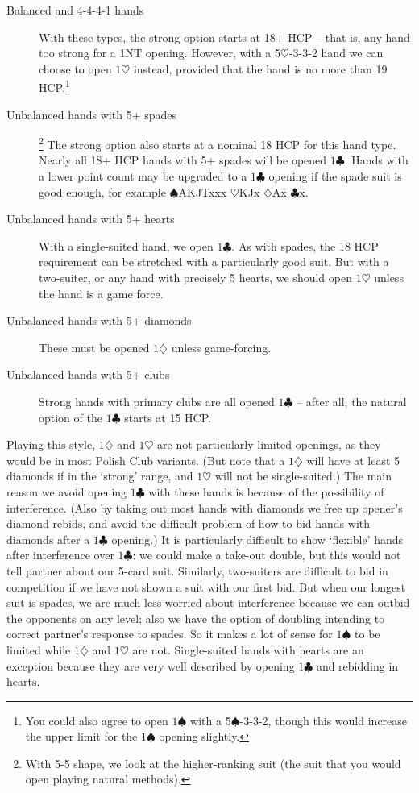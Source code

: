 \documentclass{article}
\newcommand{\sz}{\spadesuit}
\newcommand{\hz}{\heartsuit}
\newcommand{\dz}{\diamondsuit}
\newcommand{\cz}{\clubsuit}
\begin{document}
\begin{description}
\item[Balanced and 4-4-4-1 hands] With these types, the strong option starts at 18+ HCP -- that is, any hand too strong for a 1NT opening. However, with a 5$\hz$-3-3-2 hand we can choose to open $1\hz$ instead, provided that the hand is no more than 19 HCP.\footnote{You could also agree to open $1\sz$ with a 5$\sz$-3-3-2, though this would increase the upper limit for the $1\sz$ opening slightly.}

\item[Unbalanced hands with 5+ spades]\footnote{With 5-5 shape, we look at the higher-ranking suit (the suit that you would open playing natural methods).} The strong option also starts at a nominal 18 HCP for this hand type. Nearly all 18+ HCP hands with 5+ spades will be opened $1\cz$. Hands with a lower point count may be upgraded to a $1\cz$ opening if the spade suit is good enough, for example $\sz$AKJTxxx $\hz$KJx $\dz$Ax $\cz$x.

\item[Unbalanced hands with 5+ hearts] With a single-suited hand, we open $1\cz$. As with spades, the 18 HCP requirement can be stretched with a particularly good suit. But with a two-suiter, or any hand with precisely 5 hearts, we should open $1\hz$ unless the hand is a game force. 

\item[Unbalanced hands with 5+ diamonds] These must be opened $1\dz$ unless game-forcing.

\item[Unbalanced hands with 5+ clubs] Strong hands with primary clubs are all opened $1\cz$ -- after all, the natural option of the $1\cz$ starts at 15 HCP.

\end{description}

Playing this style, $1\dz$ and $1\hz$ are not particularly limited openings, as they would be in most Polish Club variants. (But note that a $1\dz$ will have at least 5 diamonds if in the `strong' range, and $1\hz$ will not be single-suited.) The main reason we avoid opening $1\cz$ with these hands is because of the possibility of interference. (Also by taking out most hands with diamonds we free up opener's diamond rebids, and avoid the difficult problem of how to bid hands with diamonds after a $1\cz$ opening.) It is particularly difficult to show `flexible' hands after interference over $1\cz$: we could make a take-out double, but this would not tell partner about our 5-card suit. Similarly, two-suiters are difficult to bid in competition if we have not shown a suit with our first bid. But when our longest suit is spades, we are much less worried about interference because we can outbid the opponents on any level; also we have the option of doubling intending to correct partner's response to spades. So it makes a lot of sense for $1\sz$ to be limited while $1\dz$ and $1\hz$ are not. Single-suited hands with hearts are an exception because they are very well described by opening $1\cz$ and rebidding in hearts.
\end{document}
